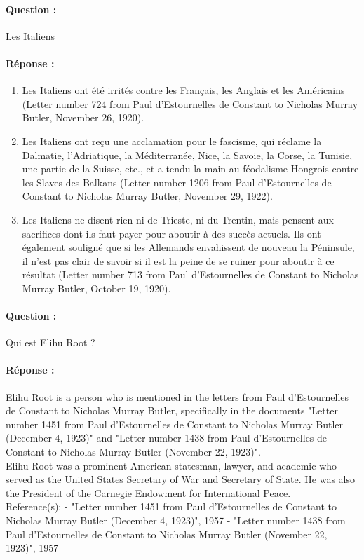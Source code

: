 \separation

\paragraph{Question : } Les Italiens

\paragraph{Réponse : }
\begin{enumerate}
    \item Les Italiens ont été irrités contre les Français, les Anglais et les Américains (Letter number 724 from Paul d'Estournelles de Constant to Nicholas Murray Butler, November 26, 1920).
    \item Les Italiens ont reçu une acclamation pour le fascisme, qui réclame la Dalmatie, l'Adriatique, la Méditerranée, Nice, la Savoie, la Corse, la Tunisie, une partie de la Suisse, etc., et a tendu la main au féodalisme Hongrois contre les Slaves des Balkans (Letter number 1206 from Paul d'Estournelles de Constant to Nicholas Murray Butler, November 29, 1922).
    \item Les Italiens ne disent rien ni de Trieste, ni du Trentin, mais pensent aux sacrifices dont ils faut payer pour aboutir à des succès actuels. Ils ont également souligné que si les Allemands envahissent de nouveau la Péninsule, il n'est pas clair de savoir si il est la peine de se ruiner pour aboutir à ce résultat (Letter number 713 from Paul d'Estournelles de Constant to Nicholas Murray Butler, October 19, 1920).
\end{enumerate}

\separation

\paragraph{Question : } Qui est Elihu Root ?

\paragraph{Réponse : } Elihu Root is a person who is mentioned in the letters from Paul d'Estournelles de Constant to Nicholas Murray Butler, specifically in the documents "Letter number 1451 from Paul d'Estournelles de Constant to Nicholas Murray Butler (December 4, 1923)" and "Letter number 1438 from Paul d'Estournelles de Constant to Nicholas Murray Butler (November 22, 1923)". \\ 
Elihu Root was a prominent American statesman, lawyer, and academic who served as the United States Secretary of War and Secretary of State. He was also the President of the Carnegie Endowment for International Peace. \\
Reference(s): - "Letter number 1451 from Paul d'Estournelles de Constant to Nicholas Murray Butler (December 4, 1923)", 1957 - "Letter number 1438 from Paul d'Estournelles de Constant to Nicholas Murray Butler (November 22, 1923)", 1957

